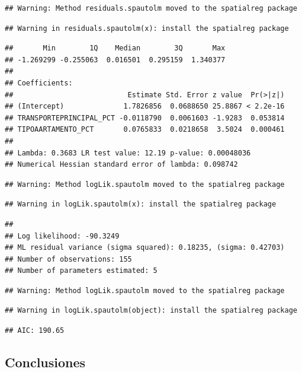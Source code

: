 \documentclass[11pt,]{article}
\begin{document}
\begin{verbatim}
## Warning: Method residuals.spautolm moved to the spatialreg package
\end{verbatim}

\begin{verbatim}
## Warning in residuals.spautolm(x): install the spatialreg package
\end{verbatim}

\begin{verbatim}
##       Min        1Q    Median        3Q       Max 
## -1.269299 -0.255063  0.016501  0.295159  1.340377 
## 
## Coefficients: 
##                           Estimate Std. Error z value  Pr(>|z|)
## (Intercept)              1.7826856  0.0688650 25.8867 < 2.2e-16
## TRANSPORTEPRINCIPAL_PCT -0.0118790  0.0061603 -1.9283  0.053814
## TIPOAARTAMENTO_PCT       0.0765833  0.0218658  3.5024  0.000461
## 
## Lambda: 0.3683 LR test value: 12.19 p-value: 0.00048036 
## Numerical Hessian standard error of lambda: 0.098742
\end{verbatim}

\begin{verbatim}
## Warning: Method logLik.spautolm moved to the spatialreg package
\end{verbatim}

\begin{verbatim}
## Warning in logLik.spautolm(x): install the spatialreg package
\end{verbatim}

\begin{verbatim}
## 
## Log likelihood: -90.3249 
## ML residual variance (sigma squared): 0.18235, (sigma: 0.42703)
## Number of observations: 155 
## Number of parameters estimated: 5
\end{verbatim}

\begin{verbatim}
## Warning: Method logLik.spautolm moved to the spatialreg package
\end{verbatim}

\begin{verbatim}
## Warning in logLik.spautolm(object): install the spatialreg package
\end{verbatim}

\begin{verbatim}
## AIC: 190.65
\end{verbatim}

\subsection{Conclusiones}\label{conclusiones}
\end{document}
